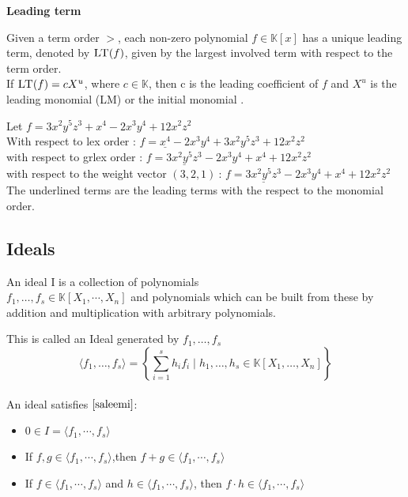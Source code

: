 \textbf{Leading term}

Given a term order $>$, each non-zero polynomial $f \in \mathbb{K}\left[ x\right] $ has a unique leading term, denoted by $\textsc{LT}(f)$, given by the largest involved term with respect to the term order.\\
If $\textsc{LT}(f) = cX^{u}$, where $c \in \mathbb{K}$, then c is the leading coefficient of $f$ and $X^{u}$ is the leading monomial (\textsc{LM}) or the initial monomial \cite{KHZ}.\\

\begin{env_example}\normalfont

Let $ f = 3x^{2}y^{5}z^{3} + x^{4} -2x^{3}y^{4} + 12x^{2}z^{2}$ \\
With respect to lex order : $f = \underline{x^{4}} -2x^{3}y^{4} + 3x^{2}y^{5}z^{3} + 12x^{2}z^{2} $ \\
with respect to grlex order : $f = \underline{3x^{2}y^{5}z^{3}} -2x^{3}y^{4} + x^{4}+ 12x^{2}z^{2}$  \\
with respect to the weight vector $\left(3,2,1\right)~$: $f = \underline{3x^{2}y^{5}z^{3}} -2x^{3}y^{4} + x^{4}+ 12x^{2}z^{2}$  \\ 
The underlined terms are the leading terms with the respect to the monomial order.

\end{env_example}

\newpage
\subsection{Ideals}
\label{subsec:Ideals}

\begin{env_definition}[Ideal]
\cite{KHZ}
An ideal I is a collection of polynomials \\ $f_{1},\dots ,f_{s} \in \mathbb{K}\left[X_{1}, \cdots, X_{n}\right] $ and polynomials which can be built from these by addition and multiplication with arbitrary polynomials.

\end{env_definition}
This is called an Ideal generated by $f_{1}, \dots , f_{s}$ \\
\[ \langle f_{1}, \dots , f_{s} \rangle = \left\lbrace  \sum_{i=1}^s h_{i}f_{i} \mid h_{1}, \dots , h_{s} \in \mathbb{K}\left[X_{1}, \dots, X_{n}\right] \right\rbrace \]
\\
An ideal satisfies $\cite{saleemi} $:
\begin{center}

\begin{itemize}
\item
$0 \in I = \langle f_{1}, \cdots , f_{s} \rangle$ 
\item
If $f,g \in \langle f_{1}, \cdots , f_{s} \rangle$,then  $f+g \in \langle f_{1}, \cdots , f_{s} \rangle$ 
\item
If $f \in \langle f_{1}, \cdots , f_{s} \rangle$ and $h \in  \langle f_{1}, \cdots , f_{s} \rangle$, then $f \cdot h \in \langle f_{1}, \cdots , f_{s} \rangle$
\end{itemize}

\end{center}


